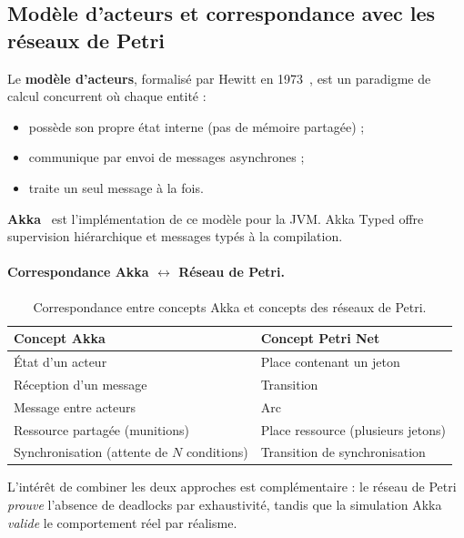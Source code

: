 \documentclass[11pt,a4paper]{article}
\begin{document}
\subsection{Modèle d'acteurs et correspondance avec les réseaux de Petri}

Le \textbf{modèle d'acteurs}, formalisé par Hewitt en 1973~\cite{hewitt1973},
est un paradigme de calcul concurrent où chaque entité :
\begin{itemize}[leftmargin=1.2cm,itemsep=2pt]
  \item possède son propre état interne (pas de mémoire partagée) ;
  \item communique par envoi de messages asynchrones ;
  \item traite un seul message à la fois.
\end{itemize}

\textbf{Akka}~\cite{lightbend2024} est l'implémentation de ce modèle pour la
JVM. Akka Typed offre supervision hiérarchique et messages typés à la
compilation.

\paragraph{Correspondance Akka $\leftrightarrow$ Réseau de Petri.}
\begin{table}[H]
\centering\small
\begin{tabularx}{\linewidth}{l X}
\toprule
\rowcolor{tableheader}\textbf{Concept Akka} & \textbf{Concept Petri Net} \\
\midrule
État d'un acteur                       & Place contenant un jeton \\
Réception d'un message                 & Transition \\
Message entre acteurs                  & Arc \\
Ressource partagée (munitions)         & Place ressource (plusieurs jetons) \\
Synchronisation (attente de $N$ conditions) & Transition de synchronisation \\
\bottomrule
\end{tabularx}
\caption{Correspondance entre concepts Akka et concepts des réseaux de Petri.}
\end{table}

\noindent
L'intérêt de combiner les deux approches est complémentaire : le réseau de
Petri \emph{prouve} l'absence de deadlocks par exhaustivité, tandis que la
simulation Akka \emph{valide} le comportement réel par réalisme.
\end{document}
